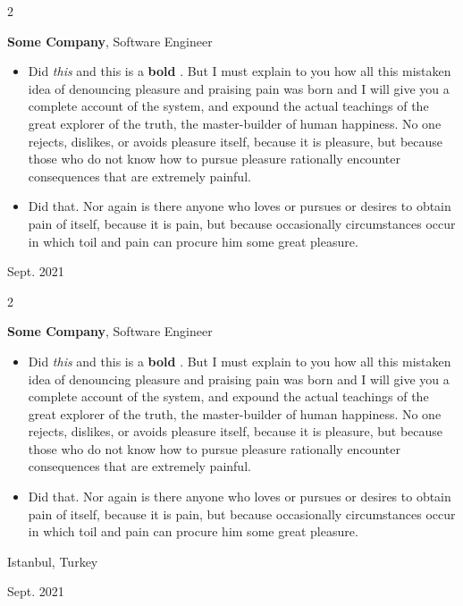 \documentclass[10pt, letterpaper]{article}
\newenvironment{highlights}{
    \begin{itemize}[
        topsep=0.10 cm,
        parsep=0.10 cm,
        partopsep=0pt,
        itemsep=0pt,
        leftmargin=0.4 cm + 10pt
    ]
}{
    \end{itemize}
} %
\newenvironment{twocolentry}[2][]{
    \onecolentry
    \def\secondColumn{#2}
    \setcolumnwidth{\fill, 4.5 cm}
    \begin{paracol}{2}
}{
    \switchcolumn \raggedleft \secondColumn
    \end{paracol}
    \endonecolentry
} %
\let\hrefWithoutArrow\href
\renewcommand{\href}[2]{\hrefWithoutArrow{#1}{\mbox{\ifthenelse{\equal{#2}{}}{ }{#2 }\raisebox{.15ex}{\footnotesize \faExternalLink*}}}}
\begin{document}
        \vspace{0.2 cm}

        \begin{twocolentry}{
            Sept. 2021
        }
            \textbf{Some \textnormal{Company}}, Software Engineer
            \begin{highlights}
                \item Did \textit{this} and this is a \textbf{bold} \href{https://example.com}{link}. But I must explain to you how all this mistaken idea of denouncing pleasure and praising pain was born and I will give you a complete account of the system, and expound the actual teachings of the great explorer of the truth, the master-builder of human happiness. No one rejects, dislikes, or avoids pleasure itself, because it is pleasure, but because those who do not know how to pursue pleasure rationally encounter consequences that are extremely painful.
                \item Did that. Nor again is there anyone who loves or pursues or desires to obtain pain of itself, because it is pain, but because occasionally circumstances occur in which toil and pain can procure him some great pleasure.
            \end{highlights}
        \end{twocolentry}


        \vspace{0.2 cm}

        \begin{twocolentry}{
            Istanbul, Turkey

        Sept. 2021
        }
            \textbf{Some \textnormal{Company}}, Software Engineer
            \begin{highlights}
                \item Did \textit{this} and this is a \textbf{bold} \href{https://example.com}{link}. But I must explain to you how all this mistaken idea of denouncing pleasure and praising pain was born and I will give you a complete account of the system, and expound the actual teachings of the great explorer of the truth, the master-builder of human happiness. No one rejects, dislikes, or avoids pleasure itself, because it is pleasure, but because those who do not know how to pursue pleasure rationally encounter consequences that are extremely painful.
                \item Did that. Nor again is there anyone who loves or pursues or desires to obtain pain of itself, because it is pain, but because occasionally circumstances occur in which toil and pain can procure him some great pleasure.
            \end{highlights}
        \end{twocolentry}
\end{document}
